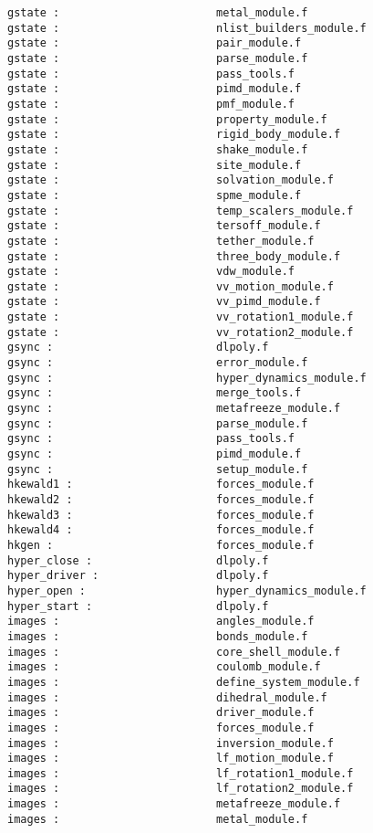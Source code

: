 \begin{verbatim}
gstate :                        metal_module.f
gstate :                        nlist_builders_module.f
gstate :                        pair_module.f
gstate :                        parse_module.f
gstate :                        pass_tools.f
gstate :                        pimd_module.f
gstate :                        pmf_module.f
gstate :                        property_module.f
gstate :                        rigid_body_module.f
gstate :                        shake_module.f
gstate :                        site_module.f
gstate :                        solvation_module.f
gstate :                        spme_module.f
gstate :                        temp_scalers_module.f
gstate :                        tersoff_module.f
gstate :                        tether_module.f
gstate :                        three_body_module.f
gstate :                        vdw_module.f
gstate :                        vv_motion_module.f
gstate :                        vv_pimd_module.f
gstate :                        vv_rotation1_module.f
gstate :                        vv_rotation2_module.f
gsync :                         dlpoly.f
gsync :                         error_module.f
gsync :                         hyper_dynamics_module.f
gsync :                         merge_tools.f
gsync :                         metafreeze_module.f
gsync :                         parse_module.f
gsync :                         pass_tools.f
gsync :                         pimd_module.f
gsync :                         setup_module.f
hkewald1 :                      forces_module.f
hkewald2 :                      forces_module.f
hkewald3 :                      forces_module.f
hkewald4 :                      forces_module.f
hkgen :                         forces_module.f
hyper_close :                   dlpoly.f
hyper_driver :                  dlpoly.f
hyper_open :                    hyper_dynamics_module.f
hyper_start :                   dlpoly.f
images :                        angles_module.f
images :                        bonds_module.f
images :                        core_shell_module.f
images :                        coulomb_module.f
images :                        define_system_module.f
images :                        dihedral_module.f
images :                        driver_module.f
images :                        forces_module.f
images :                        inversion_module.f
images :                        lf_motion_module.f
images :                        lf_rotation1_module.f
images :                        lf_rotation2_module.f
images :                        metafreeze_module.f
images :                        metal_module.f

\end{verbatim}
